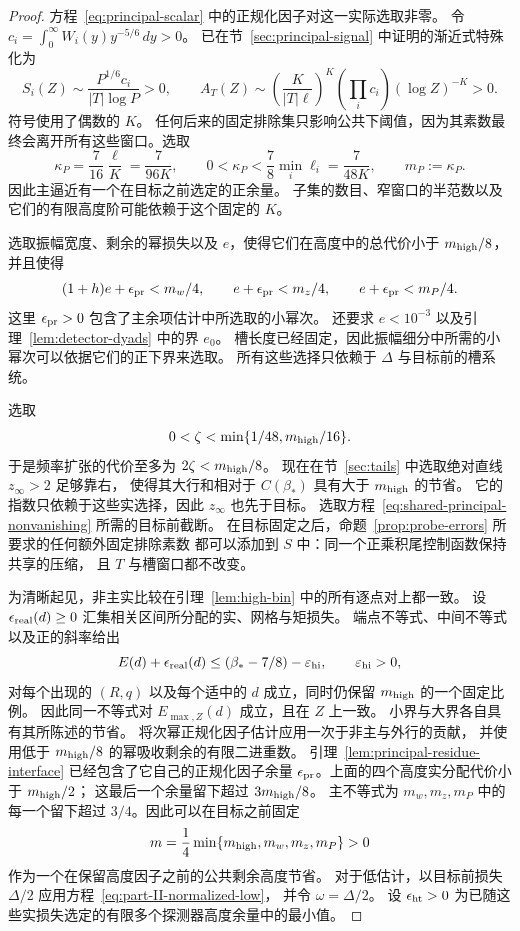 \begin{proof}
方程~\eqref{eq:principal-scalar} 中的正规化因子对这一实际选取非零。
令
\(c_i=\int_0^\infty W_i(y)y^{-5/6}\,dy>0\)。
已在节~\ref{sec:principal-signal} 中证明的渐近式特殊化为
\[
 S_i(Z)\sim\frac{P^{1/6}c_i}{|T|\log P}>0,\qquad
 A_T(Z)\sim
 \left(\frac{K}{|T|\ell}\right)^K
       \left(\prod_i c_i\right)(\log Z)^{-K}>0.
\]
符号使用了偶数的 \(K\)。
任何后来的固定排除集只影响公共下阈值，因为其素数最终会离开所有这些窗口。选取
\[
 \kappa_P=\frac7{16}\frac{\ell}{K}=\frac7{96K},
 \qquad 0<\kappa_P<\frac78\min_i\ell_i=\frac7{48K},
 \qquad m_P:=\kappa_P.
\]
因此主逼近有一个在目标之前选定的正余量。
子集的数目、窄窗口的半范数以及它们的有限高度阶可能依赖于这个固定的 \(K\)。

选取振幅宽度、剩余的幂损失以及 \(e\)，使得它们在高度中的总代价小于 \(m_{\rm high}/8\)，
并且使得
\[
 (1+h)e+\epsilon_{\rm pr}<m_w/4,\qquad
 e+\epsilon_{\rm pr}<m_z/4,\qquad
 e+\epsilon_{\rm pr}<m_P/4.
\]
这里 \(\epsilon_{\rm pr}>0\) 包含了主余项估计中所选取的小幂次。
还要求 \(e<10^{-3}\) 以及引理~\ref{lem:detector-dyads} 中的界 \(e_0\)。
槽长度已经固定，因此振幅细分中所需的小幂次可以依据它们的正下界来选取。
所有这些选择只依赖于 \(\Delta\) 与目标前的槽系统。

选取
\[
 0<\zeta<\min\{1/48,m_{\rm high}/16\}.
\]
于是频率扩张的代价至多为 \(2\zeta<m_{\rm high}/8\)。
现在在节~\ref{sec:tails} 中选取绝对直线 \(z_\infty>2\) 足够靠右，
使得其大行和相对于 \(C(\beta_*)\) 具有大于 \(m_{\rm high}\) 的节省。
它的指数只依赖于这些实选择，因此 \(z_\infty\) 也先于目标。
选取方程~\eqref{eq:shared-principal-nonvanishing} 所需的目标前截断。
在目标固定之后，命题~\ref{prop:probe-errors} 所要求的任何额外固定排除素数
都可以添加到 \(S\) 中：同一个正乘积尾控制函数保持共享的压缩，
且 \(T\) 与槽窗口都不改变。

为清晰起见，非主实比较在引理~\ref{lem:high-bin} 中的所有逐点对上都一致。
设 \(\epsilon_{\rm real}(d)\ge0\) 汇集相关区间所分配的实、网格与矩损失。
端点不等式、中间不等式以及正的斜率给出
\begin{equation}\label{eq:saving-criterion}
 E(d)+\epsilon_{\rm real}(d)
 \le(\beta_*-7/8)-\varepsilon_{\rm hi},
 \qquad \varepsilon_{\rm hi}>0,
\end{equation}
对每个出现的 \((R,q)\) 以及每个适中的 \(d\) 成立，同时仍保留 \(m_{\rm high}\) 的一个固定比例。
因此同一不等式对 \(E_{\max,Z}(d)\) 成立，且在 \(Z\) 上一致。
小界与大界各自具有其所陈述的节省。
将次幂正规化因子估计应用一次于非主与外行的贡献，
并使用低于 \(m_{\rm high}/8\) 的幂吸收剩余的有限二进重数。
引理~\ref{lem:principal-residue-interface} 已经包含了它自己的正规化因子余量
\(\epsilon_{\rm pr}\)。上面的四个高度实分配代价小于 \(m_{\rm high}/2\)；
这最后一个余量留下超过 \(3m_{\rm high}/8\)。
主不等式为 \(m_w,m_z,m_P\) 中的每一个留下超过 \(3/4\)。因此可以在目标之前固定
\[
 m=\frac14\min\{m_{\rm high},m_w,m_z,m_P\}>0
\]
作为一个在保留高度因子之前的公共剩余高度节省。
对于低估计，以目标前损失 \(\Delta/2\) 应用方程~\eqref{eq:part-II-normalized-low}，
并令 \(\omega=\Delta/2\)。
设 \(\epsilon_{\rm ht}>0\) 为已随这些实损失选定的有限多个探测器高度余量中的最小值。


\end{proof}
